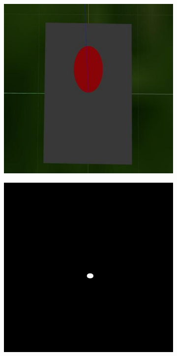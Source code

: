 \documentclass[conf]{new-aiaa}
\begin{document}
\begin{figure}[t]
\begin{subfigure}{0.25\textwidth}
    \includegraphics[width=\linewidth]{target2.jpg}
    \caption{} \label{fig:land_target}
  \end{subfigure}%
  \hspace*{\fill}   %
  \begin{subfigure}{0.25\textwidth}
    \includegraphics[width=\linewidth]{mask.png}

\end{subfigure}
\end{figure}
\end{document}
